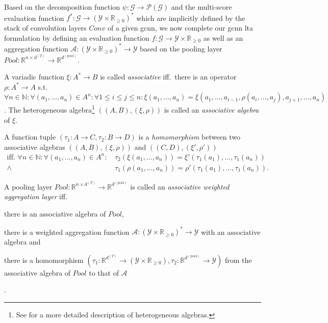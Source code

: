 Based on the decomposition function $\psi: \mathcal{G} \to \mathcal{P}(\mathcal{G})$ and the multi-score evaluation function $f^{*}: \mathcal{G} \to {(\mathcal{Y} \times \mathbb{R}_{\geq 0})}^{*}$ which are implicitly defined by the stack of convolution layers $\mathit{Conv}$ of a given \ac{gcnn}, we now complete our \ac{gcnn} \ac{lta} formulation by defining an evaluation function $f: \mathcal{G} \to \mathcal{Y} \times \mathbb{R}_{\geq 0}$ as well as an aggregation function $\mathcal{A}: {(\mathcal{Y} \times \mathbb{R}_{\geq 0})}^{*} \to \mathcal{Y}$ based on the pooling layer $\mathit{Pool}: \mathbb{R}^{n \times d^{(T)}} \to \mathbb{R}^{d^{(\mathrm{pool})}}$.
\begin{defn}\label{defn:ltag:assoc-algebra}
	A variadic function $\xi: A^{*} \to B$ is called \textit{associative} iff.\ there is an operator $\rho: A^{*} \to A$ s.t.\ $\forall n \in \mathbb{N}: \forall (a_1, \dots, a_n) \in A^n: \forall {1 \leq i \leq j \leq n}: \xi(a_1, \dots, a_n) = \xi(a_1, \dots, a_{i-1}, \rho(a_i, \dots, a_j), a_{j+1}, \dots, a_n)$.
	The heterogeneous algebra\footnote{
		See \citet{Birkhoff1970} for a more detailed description of heterogeneous algebras.
	} $((A, B), (\xi, \rho))$ is called an \textit{associative algebra} of $\xi$.
\end{defn}
\begin{defn}\label{defn:ltag:assoc-algebra-homomorphism}
	A function tuple $(\tau_1: A \to C, \tau_2: B \to D)$ is a \textit{homomorphism} between two associative algebras $((A, B), (\xi, \rho))$ and $((C, D), (\xi', \rho'))$
	\begin{align*}
		\text{iff.\ }
		\forall n \in \mathbb{N}: \forall (a_1, \dots, a_n) \in A^n:
		\, &\tau_2(\xi(a_1, \dots, a_n)) = \xi'(\tau_1(a_1), \dots, \tau_1(a_n)) \\
		\land\, &\tau_1(\rho(a_1, \dots, a_n)) = \rho'(\tau_1(a_1), \dots, \tau_1(a_n)) %
		\text{.}
	\end{align*}
\end{defn}
\begin{defn}\label{defn:ltag:assoc-aggregation-pooling}
	A pooling layer $\mathit{Pool}: \mathbb{R}^{n \times d^{(T)}} \to \mathbb{R}^{d^{(\mathrm{pool})}}$ is called an \textit{associative weighted aggregation layer} iff.
	\begin{enumerate*}
		\item there is an associative algebra of $\mathit{Pool}$,
		\item there is a weighted aggregation function $\mathcal{A}: {(\mathcal{Y} \times \mathbb{R}_{\geq 0})}^{*} \to \mathcal{Y}$ with an associative algebra and
		\item there is a homomorphism $(\tau_{1}: \mathbb{R}^{d^{(T)}} \to (\mathcal{Y} \times \mathbb{R}_{\geq 0}), \tau_{2}: \mathbb{R}^{d^{(\mathrm{pool})}} \to \mathcal{Y})$ from the associative algebra of $\mathit{Pool}$ to that of $\mathcal{A}$
	\end{enumerate*}.
\end{defn}
